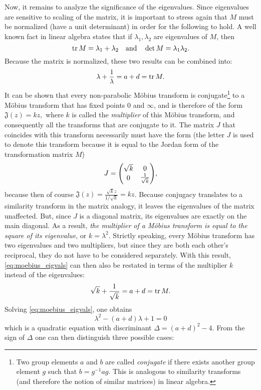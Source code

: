 Now, it remains to analyze the significance of the eigenvalues. Since eigenvalues are sensitive to scaling of the matrix, it is important to stress again that \(M\) must be normalized (have a unit determinant) in order for the following to hold. A well known fact in linear algebra states that if \(\lambda_1, \lambda_2\) are eigenvalues of \(M\), then
\[ \trace{M} = \lambda_1 + \lambda_2 \quad\text{and}\quad \det M  = \lambda_1 \lambda_2.\]
Because the matrix is normalized, these two results can be combined into:
\begin{equation}
    \lambda + \frac{1}{\lambda} = a + d = \trace{M}.
    \label{eq:moebius_eigvals}
\end{equation}
It can be shown that every non-parabolic Möbius transform is conjugate\footnote{Two group elements \(a\) and \(b\) are called \emph{conjugate} if there exists another group element \(g\) such that \(b = g^{-1}ag\). This is analogous to similarity transforms (and therefore the notion of similar matrices) in linear algebra. } to a Möbius transform that has fixed points 0 and \(\infty\), and is therefore of the form
\(\mathfrak{J}(z) = kz,\)
where \(k\) is called the \emph{multiplier} of this Möbius transform, and consequently all the transforms that are conjugate to it. The matrix \(J\) that coincides with this transform necessarily must have the form (the letter \(J\) is used to denote this transform because it is equal to the Jordan form of the transformation matrix \(M\)) \cite{Needham1997}
\[J = \mqty(\dmat[0]{\sqrt{k}, \frac{1}{\sqrt{k}}}), \]
because then of course \(\mathfrak{J}(z) = \frac{\sqrt{k}z}{1/\sqrt{k}} = kz\). Because conjugacy translates to a similarity transform in the matrix analogy, it leaves the eigenvalues of the matrix unaffected. But, since \(J\) is a diagonal matrix, its eigenvalues are exactly on the main diagonal. As a result, \emph{the multiplier of a Möbius transform is equal to the square of its eigenvalue}, or \(k = \lambda^2\). Strictly speaking, every Möbius transform has two eigenvalues and two multipliers, but since they are both each other's reciprocal, they do not have to be considered separately. With this result, \cref{eq:moebius_eigvals} can then also be restated in terms of the multiplier \(k\) instead of the eigenvalues:
    \[\sqrt{k} + \frac{1}{\sqrt{k}} = a + d = \trace{M}.\]
Solving \cref{eq:moebius_eigvals}, one obtains
 \[ \lambda^2 - (a + d)\lambda + 1 = 0\]
 which is a quadratic equation with discriminant \(\Delta = (a + d)^2 - 4\). From the sign of \(\Delta\) one can then distinguish three possible cases:
